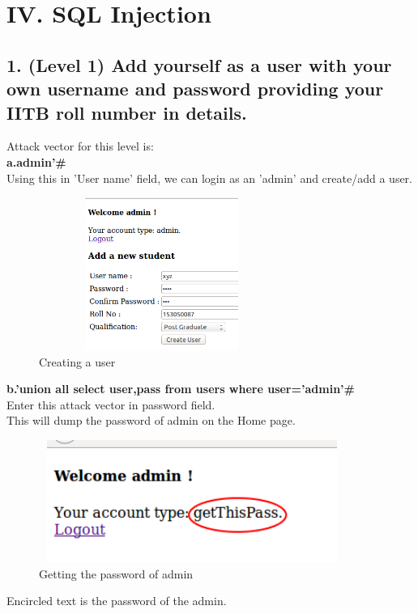 \documentclass{article}
\begin{document}
\section*{IV. SQL Injection}

\subsection*{1. (Level 1) Add yourself as a user with your own username and password providing your IITB roll number in details.}
  Attack vector for this level is:\\
        \textbf{a.\space \space admin'\#}\\
  Using this in 'User name' field, we can login as an 'admin' and create/add a user.\\
	\begin{figure}[htb]
	    \begin{center}
		\includegraphics[width=8cm,height=5cm]{1.png}
		\caption{Creating a user}
	    \end{center}
	\end{figure}
       
       \textbf{b.\space \space 'union all select user,pass from users where user='admin'\#}\\
               Enter this attack vector in password field.\\
               This will dump the password of admin on the Home page.\\
   
   \begin{figure}[htb]
	    \begin{center}
		\includegraphics[width=10cm,height=4cm]{2.png}
		\caption{Getting the password of admin}
	    \end{center}
	\end{figure}
        Encircled text is the password of the admin.\\
\end{document}
